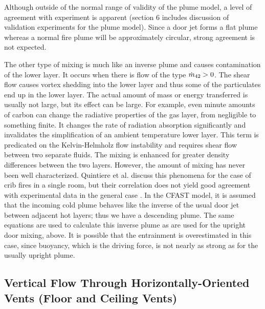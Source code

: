 Although outside of the normal range of validity of the plume model, a level of agreement with experiment is apparent (section 6 includes discussion of validation experiments for the plume model).  Since a door jet forms a flat plume whereas a normal fire plume will be approximately circular, strong agreement is not expected.

The other type of mixing is much like an inverse plume and causes contamination of the lower layer.  It occurs when there is flow of the type $\dot{m}_{42} > 0$.  The shear flow causes vortex shedding into the lower layer and thus some of the particulates end up in the lower layer.  The actual amount of mass or energy transferred is usually not large, but its effect can be large.  For example, even minute amounts of carbon can change the radiative properties of the gas layer, from negligible to something finite.  It changes the rate of radiation absorption significantly and invalidates the simplification of an ambient temperature lower layer.  This term is predicated on the Kelvin-Helmholz flow instability and requires shear flow between two separate fluids.  The mixing is enhanced for greater density differences between the two layers. However, the amount of mixing has never been well characterized. Quintiere et al. \cite{Quintiere:1984} discuss this phenomena for the case of crib fires in a single room, but their correlation does not yield good agreement with experimental data in the general case \cite{Quintiere:1981}.  In the CFAST model, it is assumed that the incoming cold plume behaves like the inverse of the usual door jet between adjacent hot layers; thus we have a descending plume.  The same equations are used to calculate this inverse plume as are used for the upright door mixing, above. It is possible that the entrainment is overestimated in this case, since buoyancy, which is the driving force, is not nearly as strong as for the usually upright plume.

\subsection{Vertical Flow Through Horizontally-Oriented Vents (Floor and Ceiling Vents)}

